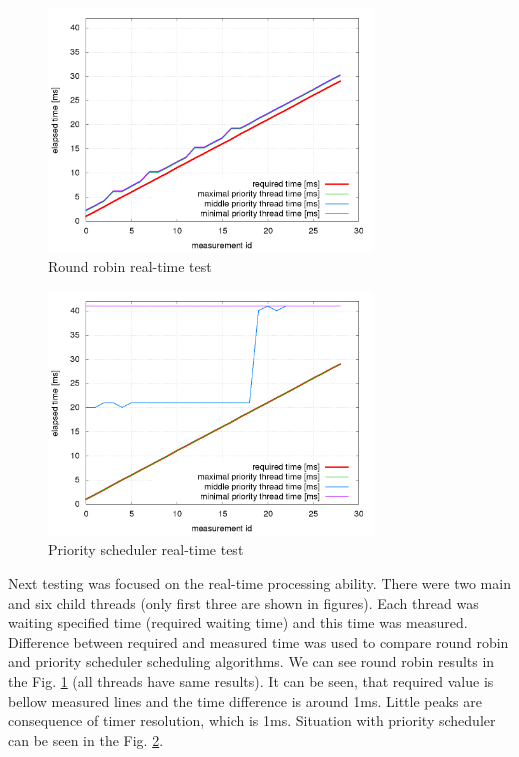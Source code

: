 \documentclass[a4paper, conference]{IEEEtran}
\begin{document}
\begin{figure}[!b]
\centering
\includegraphics[width=3.4in]{round_robin_scheduler_perfomance.png}
\caption{Round robin real-time test}
\label{fig_round_robin_scheduler_perfomance}
\end{figure}


\begin{figure}[!t]
\centering
\includegraphics[width=3.4in]{priority_scheduler_perfomance.png}
\caption{Priority scheduler real-time test}
\label{fig_priority_scheduler_perfomance}
\end{figure}



Next testing was focused on the real-time processing ability. There were two main and six child threads (only first three are shown in figures). Each thread was waiting specified time (required waiting time) and this time was measured. Difference between required and measured time was used to compare round robin and priority scheduler scheduling algorithms. 
\balance
We can see round robin results in the Fig. \ref{fig_round_robin_scheduler_perfomance} (all threads have same results). It can be seen, that required value is bellow measured lines and the time difference is around 1ms. Little peaks are consequence of timer resolution, which is 1ms.
Situation with priority scheduler can be seen in the Fig. \ref{fig_priority_scheduler_perfomance}. 
\end{document}
